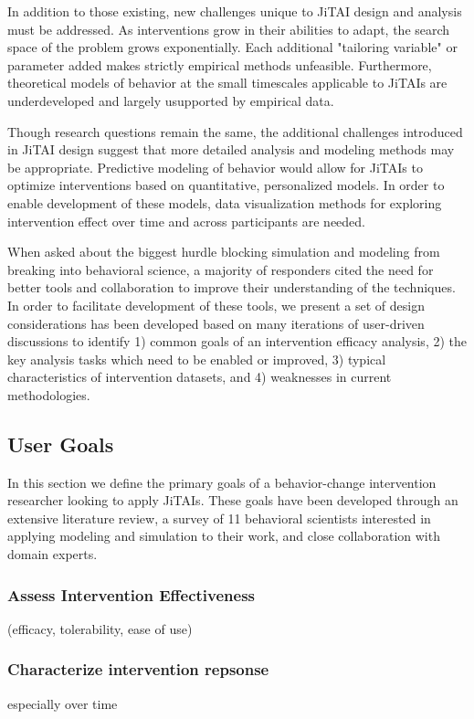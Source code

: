\documentclass[review,journal]{vgtc}         %
\begin{document}
In addition to those existing, new challenges unique to JiTAI design and analysis must be addressed.
As interventions grow in their abilities to adapt, the search space of the problem grows exponentially.
Each additional "tailoring variable" or parameter added makes strictly empirical methods unfeasible.
Furthermore, theoretical models of behavior at the small timescales applicable to JiTAIs are underdeveloped and largely usupported by empirical data. 

Though research questions remain the same, the additional challenges introduced in JiTAI design suggest that more detailed analysis and modeling methods may be appropriate.
Predictive modeling of behavior would allow for JiTAIs to optimize interventions based on quantitative, personalized models.
In order to enable development of these models, data visualization methods for exploring intervention effect over time and across participants are needed. 

When asked about the biggest hurdle blocking simulation and modeling from breaking into behavioral science, a majority of responders cited the need for better tools and collaboration to improve their understanding of the techniques.
In order to facilitate development of these tools, we present a set of design considerations has been developed based on many iterations of user-driven discussions to identify 1) common goals of an intervention efficacy analysis, 2) the key analysis tasks which need to be enabled or improved, 3) typical characteristics of intervention datasets, and 4) weaknesses in current methodologies. 

\subsection{User Goals}
In this section we define the primary goals of a behavior-change intervention researcher looking to apply JiTAIs.
These goals have been developed through an extensive literature review, a survey of 11 behavioral scientists interested in applying modeling and simulation to their work, and close collaboration with domain experts.

\subsubsection{Assess Intervention Effectiveness}
(efficacy, tolerability, ease of use)

\subsubsection{Characterize intervention repsonse}
especially over time
\end{document}
